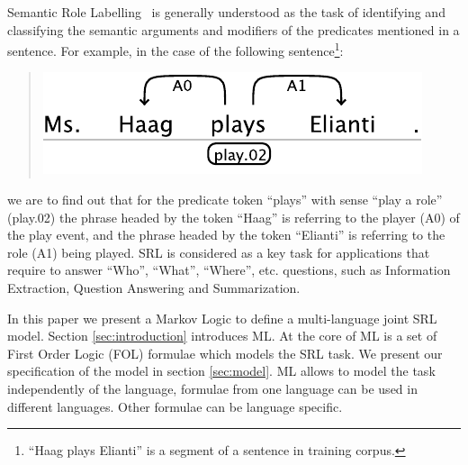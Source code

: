 
Semantic Role Labelling~\citep[SRL, ][]{marquez08srl} is generally understood as 
the task of identifying and classifying the semantic arguments and modifiers of 
the predicates mentioned in a sentence. For example, in the case of the 
following sentence\footnote{``Haag plays Elianti'' is a segment of a sentence in 
training corpus.}:
\begin{quote}
\begin{center}
    \includegraphics[scale=.63]{haag-example}
\end{center}
\end{quote}
we are to find out that for the predicate token {}``plays'' with sense ``play a 
role'' (play.02) the phrase headed by the token {}``Haag'' is referring to the 
player (A0) of the play event, and the phrase headed by the token {}``Elianti''  
is referring to the role (A1) being played. SRL is considered as a key task for 
applications that require to answer {}``Who'', {}``What'', {}``Where'', etc.  
questions, such as Information Extraction, Question Answering and Summarization.  

In this paper we present a Markov Logic \citep[ML,][]{richardson06mln} to define 
a multi-language joint SRL model. Section \ref{sec:introduction} introduces ML.  
At the core of ML is a set of First Order Logic (FOL) formulae which models the 
SRL task. We present our specification of the model in section \ref{sec:model}.  
ML allows to model the task independently of the language, formulae from one 
language can be used in different languages. Other formulae can be language 
specific.  

